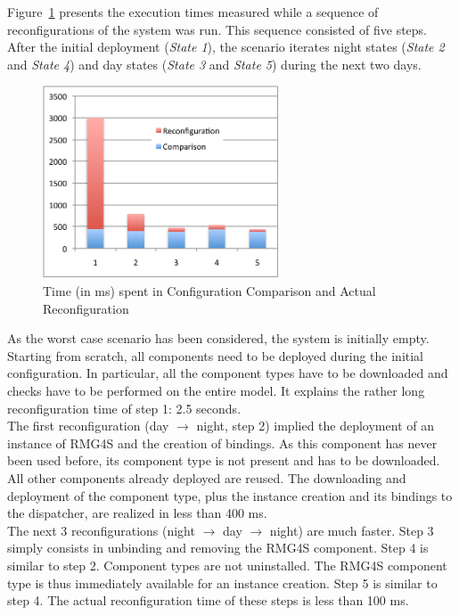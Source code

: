 Figure~\ref{figure:bench} presents the execution times measured while a sequence of reconfigurations of the system was run. This sequence consisted of five steps. After the initial deployment (\textit{State 1}), the scenario iterates night states (\textit{State 2} and \textit{State 4}) and day states (\textit{State 3} and \textit{State 5}) during the next two days.\\

\begin{figure}[h!]
\centering
\includegraphics[width=7cm]{part2/pics/benchs_graphic3}
\caption{ Time (in ms) spent in Configuration Comparison and Actual Reconfiguration}
\label{figure:bench}

\end{figure}

As the  worst case scenario has been considered, the system is initially empty. Starting from scratch, all components need to be deployed during the initial configuration. In particular, all the component types have to be downloaded and checks have to be performed on the entire model. It explains the rather long reconfiguration time of step 1:  2.5 seconds. \\

The first reconfiguration (day $\rightarrow$ night, step 2) implied the deployment of an instance of RMG4S and the creation of bindings. As this component has never been used before, its component type is not present and has to be downloaded. All other components already deployed are reused. The downloading and deployment of the component type, plus the instance creation and its bindings to the dispatcher, are realized in less than 400 ms.\\

The next 3 reconfigurations (night $\rightarrow$ day $\rightarrow$ night) are much faster. Step 3 simply consists in unbinding and removing the RMG4S component. Step 4 is similar to step 2. Component types are not uninstalled. The RMG4S component type is thus immediately available for an instance creation. Step 5 is similar to step 4. The actual reconfiguration time of these steps is less than 100 ms.\\

